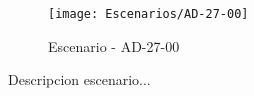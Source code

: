\begin{figure}[H]
\centering
\texttt{[image: Escenarios/AD-27-00]}
\caption{Escenario - AD-27-00}
\label{fig:AD-27-00}
\end{figure}

Descripcion escenario...
\clearpage
